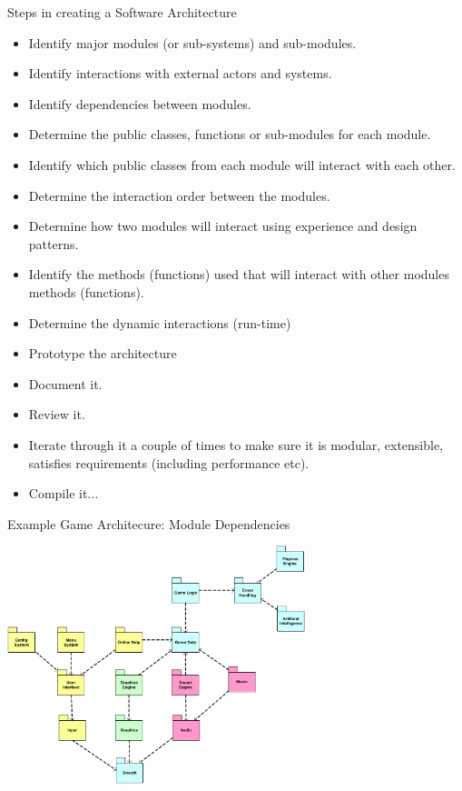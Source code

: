 \documentclass[aspectratio=1610,xcolor=dvipsnames,t,compress]{beamer}
\begin{document}
\begin{frame}{Steps in creating a Software Architecture} 
    \begin{itemize}
        \item Identify major modules (or sub-systems) and sub-modules.
        \item Identify interactions with external actors and systems.
        \item Identify dependencies between modules.
        \item Determine the public classes, functions or sub-modules for each module.
        \item Identify which public classes from each module will interact with each other.
        \item Determine the interaction order between the modules.
        \item Determine how two modules will interact using experience and design patterns.
        \item Identify the methods (functions) used that will interact with other modules methods (functions).
        \item Determine the dynamic interactions (run-time)
        \item Prototype the architecture
        \item Document it.
        \item Review it.
        \item Iterate through it a couple of times to make sure it is modular, extensible, satisfies requirements (including performance etc).
        \item Compile it...
    \end{itemize}
\end{frame} 

\begin{frame}{Example Game Architecure: Module Dependencies} 
    \begin{center}
        \includegraphics[width=0.65\textwidth]{game-architecture}
    \end{center}
\end{frame} 
\end{document}
